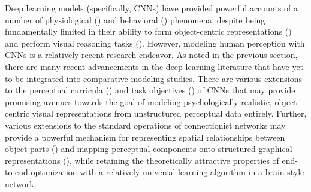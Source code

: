 \documentclass[12pt]{article}
\let\oldcite=\cite
\renewcommand{\cite}[1]{\textcolor[rgb]{0, .121, .388}{\oldcite{#1}}}
\begin{document}
Deep learning models (specifically, CNNs) have provided powerful accounts of a number of physiological (\cite{yamins2016using,kietzmann2018deep}) and behavioral (\cite{lake2015deep,peterson2016adapting,kummerer2014deep}) phenomena, despite being fundamentally limited in their ability to form object-centric representations (\cite{baker2018deep}) and perform visual reasoning tasks (\cite{stabinger201625}). However, modeling human perception with CNNs is a relatively recent research endeavor. As noted in the previous section, there are many recent advancements in the deep learning literature that have yet to be integrated into comparative modeling studies. There are various extensions to the perceptual curricula (\cite{smith2018developing,bengio2009curriculum}) and task objectives (\cite{jing2020self}) of CNNs that may provide promising avenues towards the goal of modeling psychologically realistic, object-centric visual representations from unstructured perceptual data entirely. Further, various extensions to the standard operations of connectionist networks may provide a powerful mechanism for representing spatial relationships between object parts (\cite{hinton2011transforming,sabour2017dynamic}) and mapping perceptual components onto structured graphical representations (\cite{kingma2013auto,johnson2016composing}), while retaining the theoretically attractive properties of end-to-end optimization with a relatively universal learning algorithm in a brain-style network.

\theendnotes



%
%

\pagebreak
\pagestyle{empty}
\renewcommand\bibname{References}
\printbibliography

\end{document}
